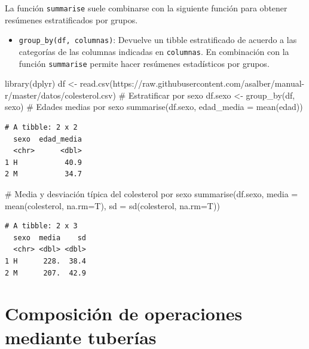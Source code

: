 \documentclass[
  a4paper,
]{scrreport}
\newenvironment{Shaded}{\begin{snugshade}}{\end{snugshade}}
\newcommand{\AttributeTok}[1]{\textcolor[rgb]{0.40,0.45,0.13}{#1}}
\newcommand{\CommentTok}[1]{\textcolor[rgb]{0.37,0.37,0.37}{#1}}
\newcommand{\FunctionTok}[1]{\textcolor[rgb]{0.28,0.35,0.67}{#1}}
\newcommand{\NormalTok}[1]{\textcolor[rgb]{0.00,0.23,0.31}{#1}}
\newcommand{\OtherTok}[1]{\textcolor[rgb]{0.00,0.23,0.31}{#1}}
\newcommand{\StringTok}[1]{\textcolor[rgb]{0.13,0.47,0.30}{#1}}
\providecommand{\tightlist}{%
  \setlength{\itemsep}{0pt}\setlength{\parskip}{0pt}}\usepackage{longtable,booktabs,array}
\theoremstyle{definition}
\theoremstyle{definition}
\theoremstyle{remark}
\begin{document}
La función \texttt{summarise} suele combinarse con la siguiente función
para obtener resúmenes estratificados por grupos.

\begin{itemize}
\tightlist
\item
  \texttt{group\_by(df,\ columnas)}: Devuelve un tibble estratificado de
  acuerdo a las categorías de las columnas indicadas en
  \texttt{columnas}. En combinación con la función \texttt{summarise}
  permite hacer resúmenes estadísticos por grupos.
\end{itemize}

\begin{Shaded}
\begin{Highlighting}[]
\FunctionTok{library}\NormalTok{(dplyr)}
\NormalTok{df }\OtherTok{\textless{}{-}} \FunctionTok{read.csv}\NormalTok{(}\StringTok{\textquotesingle{}https://raw.githubusercontent.com/asalber/manual{-}r/master/datos/colesterol.csv\textquotesingle{}}\NormalTok{)}
\CommentTok{\# Estratificar por sexo }
\NormalTok{df.sexo }\OtherTok{\textless{}{-}} \FunctionTok{group\_by}\NormalTok{(df, sexo)}
\CommentTok{\# Edades medias por sexo}
\FunctionTok{summarise}\NormalTok{(df.sexo, }\AttributeTok{edad\_media =} \FunctionTok{mean}\NormalTok{(edad))}
\end{Highlighting}
\end{Shaded}

\begin{verbatim}
# A tibble: 2 x 2
  sexo  edad_media
  <chr>      <dbl>
1 H           40.9
2 M           34.7
\end{verbatim}

\begin{Shaded}
\begin{Highlighting}[]
\CommentTok{\# Media y desviación típica del colesterol por sexo}
\FunctionTok{summarise}\NormalTok{(df.sexo, }\AttributeTok{media =} \FunctionTok{mean}\NormalTok{(colesterol, }\AttributeTok{na.rm=}\NormalTok{T), }\AttributeTok{sd =} \FunctionTok{sd}\NormalTok{(colesterol, }\AttributeTok{na.rm=}\NormalTok{T))}
\end{Highlighting}
\end{Shaded}

\begin{verbatim}
# A tibble: 2 x 3
  sexo  media    sd
  <chr> <dbl> <dbl>
1 H      228.  38.4
2 M      207.  42.9
\end{verbatim}

\hypertarget{composiciuxf3n-de-operaciones-mediante-tuberuxedas}{%
\section{Composición de operaciones mediante
tuberías}\label{composiciuxf3n-de-operaciones-mediante-tuberuxedas}}
\end{document}
